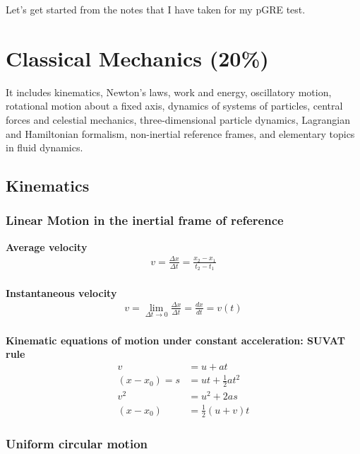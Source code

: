 \documentclass[12pt,a4paper]{article}
\begin{document}
Let's get started from the notes that I have taken for my pGRE test. 

\section{Classical Mechanics (20\%)}

It includes kinematics, Newton's laws, work and energy, oscillatory motion, rotational motion about a fixed axis, dynamics of systems of particles, central forces and celestial mechanics, three-dimensional particle dynamics, Lagrangian and Hamiltonian formalism, non-inertial reference frames, and elementary topics in fluid dynamics.

\subsection{Kinematics}

\subsubsection{Linear Motion in the inertial frame of reference}

\noindent\textbf{Average velocity}
\begin{align}
v = \frac{\Delta x}{\Delta t} = \frac{x_{2} - x_{1}}{t_{2} - t_{1}}
\end{align}
\\
\textbf{Instantaneous velocity}
\begin{align}
v = \lim_{\Delta t \to 0} \frac{\Delta x}{\Delta t} = \frac{dx}{dt} = v(t)
\end{align}
\\
\textbf{Kinematic equations of motion under constant acceleration: SUVAT rule}
\begin{align}
v &= u + at\\
(x - x_{0}) = s &= ut + \frac{1}{2}at^{2} \\
v^{2} &= u^{2} + 2as \\
(x - x_{0}) &= \frac{1}{2}(u + v)t 
\end{align}

\subsubsection{Uniform circular motion}
\end{document}
